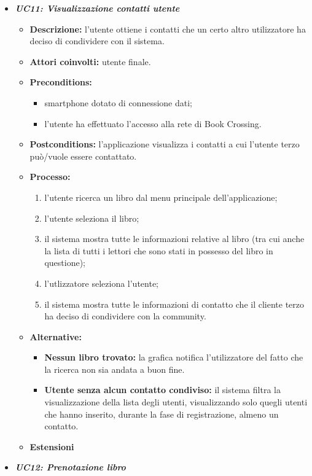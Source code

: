 \begin{itemize}
	\item \textbf{\textit{UC11: Visualizzazione contatti utente}}
	\begin{itemize}
		\item \textbf{Descrizione:} l'utente ottiene i contatti che un certo altro utilizzatore ha deciso di condividere con il sistema.
		\item \textbf{Attori coinvolti:} utente finale.
		\item \textbf{Preconditions:}
		\begin{itemize}
			\item smartphone dotato di connessione dati;
			\item l’utente ha effettuato l’accesso alla rete di Book Crossing.
		\end{itemize}
		\item \textbf{Postconditions:} l'applicazione visualizza i contatti a cui l'utente terzo può/vuole essere contattato.
		\item \textbf{Processo:}
		\begin{enumerate}
			\item l'utente ricerca un libro dal menu principale dell'applicazione;
			\item l'utente seleziona il libro;
			\item il sistema mostra tutte le informazioni relative al libro (tra cui anche la lista di tutti i lettori che sono stati in possesso del libro in questione);
			\item l'utlizzatore seleziona l'utente;
			\item il sistema mostra tutte le informazioni di contatto che il cliente terzo ha deciso di condividere con la community.
		\end{enumerate}
		\item \textbf{Alternative:}
		\begin{itemize}
			\item \textbf{Nessun libro trovato:} la grafica notifica l'utilizzatore del fatto che la ricerca non sia andata a buon fine.
			\item \textbf{Utente senza alcun contatto condiviso:} il sistema filtra la visualizzazione della lista degli utenti, visualizzando solo quegli utenti che hanno inserito, durante la fase di registrazione, almeno un contatto.
		\end{itemize}
		\item \textbf{Estensioni}
	\end{itemize}
	\item \textbf{\textit{UC12: Prenotazione libro}}

\end{itemize}
